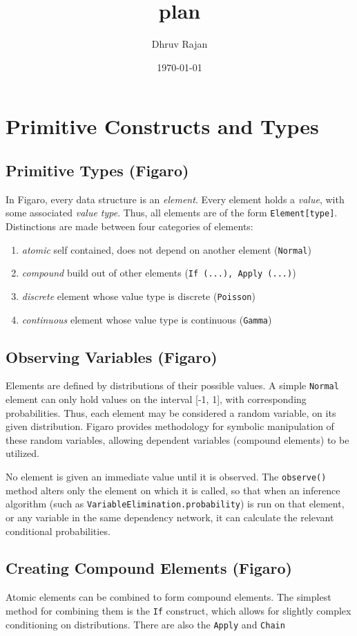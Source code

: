 \documentclass[11pt]{article}
\author{Dhruv Rajan}
\date{\today}
\title{plan}
\begin{document}
\maketitle
\tableofcontents

\section{Primitive Constructs and Types}
\label{sec-1}
\subsection{Primitive Types (Figaro)}
\label{sec-1-1}
In Figaro, every data structure is an \emph{element}. Every element
holds a \emph{value}, with some associated \emph{value type}. Thus, all
elements are of the form \texttt{Element[type]}. Distinctions are made
between four categories of elements:
\begin{enumerate}
\item \emph{atomic} self contained, does not depend on another element (\texttt{Normal})
\item \emph{compound} build out of other elements (\texttt{If (...), Apply (...)})
\item \emph{discrete} element whose value type is discrete (\texttt{Poisson})
\item \emph{continuous} element whose value type is continuous (\texttt{Gamma})
\end{enumerate}
\subsection{Observing Variables (Figaro)}
\label{sec-1-2}
Elements are defined by distributions of their possible values. A
simple \texttt{Normal} element can only hold values on the interval [-1,
1], with corresponding probabilities. Thus, each element may be
considered a random variable, on its given distribution. Figaro
provides methodology for symbolic manipulation of these random
variables, allowing dependent variables (compound elements) to be
utilized.

No element is given an immediate value until it is observed. The
\texttt{observe()} method alters only the element on which it is called, so
that when an inference algorithm (such as
\texttt{VariableElimination.probability}) is run on that element, or any
variable in the same dependency network, it can calculate the relevant
conditional probabilities.
\subsection{Creating Compound Elements (Figaro)}
\label{sec-1-3}
Atomic elements can be combined to form compound elements. The
simplest method for combining them is the \texttt{If} construct, which
allows for slightly complex conditioning on distributions. There
are also the \texttt{Apply} and \texttt{Chain}
\end{document}
